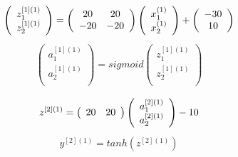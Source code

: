 \documentclass[a4paper]{article}
\begin{document}
\begin{align*}
\left( \begin{array} {c }
z_1^{[1](1)}  \\
z_2^{[1](1)}  \\
\end{array} \right)
=\left( \begin{array} {c c}
 20 & 20 \\
 -20 & -20 \\
\end{array} \right)
\left( \begin{array} {c}
x_1^{(1)}  \\
x_2^{(1)}  \\
\end{array} \right)
+
\left( \begin{array} {c}
-30  \\
10  \\
\end{array} \right)
\end{align*}
\begin{align*}
\left( \begin{array} {c }
a_1^{[1](1)}  \\
a_2^{[1](1)}  \\
\end{array} \right)
=sigmoid \left( \begin{array} {c }
z_1^{[1](1)}  \\
z_2^{[1](1)}  \\
\end{array} \right)
\end{align*}

\begin{align*}
z^{[2](1)}  
=\left( \begin{array} {c c}
 20 & 20 \\
\end{array} \right)
\left( \begin{array} {c}
a_1^{[2](1)}  \\
a_2^{[2](1)}  \\
\end{array} \right)
-10  \\
\end{align*}
\begin{align*}
y^{[2](1)}  
= tanh ( z^{[2](1)}  )
\end{align*}
\end{document}
